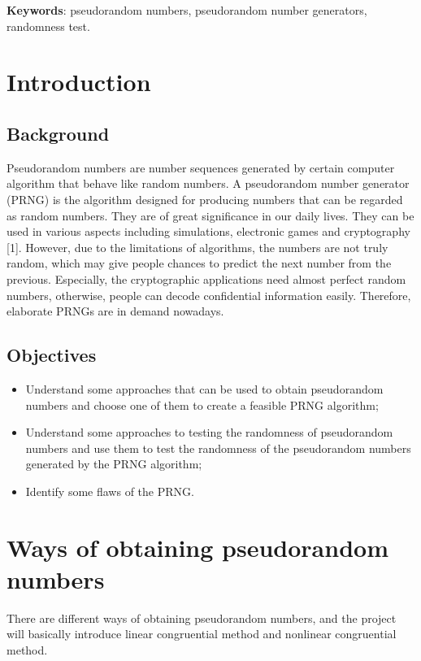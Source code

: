 \documentclass[a4paper]{article}
\begin{document}
\noindent\textbf{Keywords}: pseudorandom numbers, pseudorandom number generators, randomness test.
	
\newpage

\tableofcontents

\newpage

\section{Introduction}
	\subsection{Background}
	Pseudorandom numbers are number sequences generated by certain computer algorithm that behave like random numbers. A pseudorandom number generator (PRNG) is the algorithm designed for producing numbers that can be regarded as random numbers. They are of great significance in our daily lives. They can be used in various aspects including simulations, electronic games and cryptography [1]. However, due to the limitations of algorithms, the numbers are not truly random, which may give people chances to predict the next number from the previous. Especially, the cryptographic applications need  almost perfect random numbers, otherwise, people can decode confidential information easily. Therefore, elaborate PRNGs are in demand nowadays.

	\subsection{Objectives}
	\begin{itemize}
	\item Understand some approaches that can be used to obtain pseudorandom numbers and choose one of them to create a feasible PRNG algorithm;
	\item Understand some approaches to testing the randomness of pseudorandom numbers and use them to test the randomness of the pseudorandom numbers generated by the PRNG algorithm;
	\item Identify some flaws of the PRNG.
	\end{itemize}


\section{Ways of obtaining pseudorandom numbers}
	There are different ways of obtaining pseudorandom numbers, and the project will basically introduce linear congruential method and nonlinear congruential method.
\end{document}
